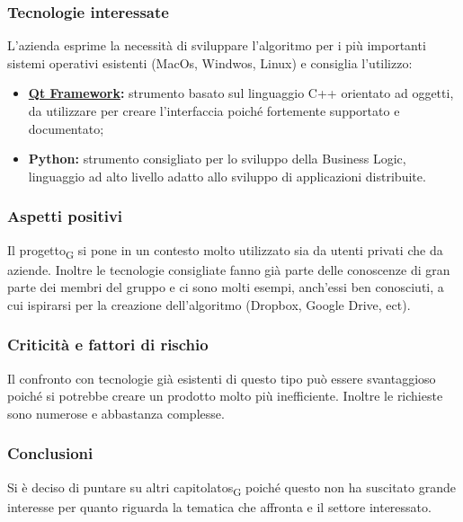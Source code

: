 \subsubsection{Tecnologie interessate}
L'azienda esprime la necessità di sviluppare l'algoritmo per i più importanti sistemi operativi esistenti (MacOs, Windwos, Linux) e consiglia l'utilizzo:
\begin{itemize}
\item \textbf{\href{https://wiki.qt.io/About_Qt}{Qt Framework}:} strumento basato sul linguaggio C++ orientato ad oggetti, da utilizzare per creare l'interfaccia poiché fortemente supportato e documentato;
\item \textbf{Python:} strumento consigliato per lo sviluppo della Business Logic, linguaggio ad alto livello adatto allo sviluppo di applicazioni distribuite.
\end{itemize}
\subsubsection{Aspetti positivi}
Il \gls{progetto}\textsubscript{G} si pone in un contesto molto utilizzato sia da utenti privati che da aziende. Inoltre le tecnologie consigliate fanno già parte delle conoscenze di gran parte dei membri del gruppo e ci sono molti esempi, anch'essi ben conosciuti, a cui ispirarsi per la creazione dell'algoritmo (Dropbox, Google Drive, ect).
\subsubsection{Criticità e fattori di rischio}
Il confronto con tecnologie già esistenti di questo tipo può essere svantaggioso poiché si potrebbe creare un prodotto molto più inefficiente. Inoltre le richieste sono numerose e abbastanza complesse.
\subsubsection{Conclusioni}
Si è deciso di puntare su altri \glspl{capitolato}\textsubscript{G} poiché questo non ha suscitato grande interesse per quanto riguarda la tematica che affronta e il settore interessato.